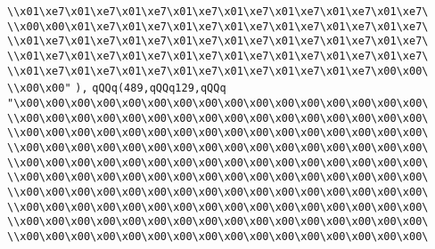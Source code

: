 \verb|\\x01\xe7\x01\xe7\x01\xe7\x01\xe7\x01\xe7\x01\xe7\x01\xe7\x01\xe7\|\newline
\verb|\\x00\x00\x01\xe7\x01\xe7\x01\xe7\x01\xe7\x01\xe7\x01\xe7\x01\xe7\|\newline
\verb|\\x01\xe7\x01\xe7\x01\xe7\x01\xe7\x01\xe7\x01\xe7\x01\xe7\x01\xe7\|\newline
\verb|\\x01\xe7\x01\xe7\x01\xe7\x01\xe7\x01\xe7\x01\xe7\x01\xe7\x01\xe7\|\newline
\verb|\\x01\xe7\x01\xe7\x01\xe7\x01\xe7\x01\xe7\x01\xe7\x01\xe7\x00\x00\|\newline
\verb|\\x00\x00"|\newline
\verb|),|\newline
\verb|qQQq(489,qQQq129,qQQq|\newline
\verb|"\x00\x00\x00\x00\x00\x00\x00\x00\x00\x00\x00\x00\x00\x00\x00\x00\|\newline
\verb|\\x00\x00\x00\x00\x00\x00\x00\x00\x00\x00\x00\x00\x00\x00\x00\x00\|\newline
\verb|\\x00\x00\x00\x00\x00\x00\x00\x00\x00\x00\x00\x00\x00\x00\x00\x00\|\newline
\verb|\\x00\x00\x00\x00\x00\x00\x00\x00\x00\x00\x00\x00\x00\x00\x00\x00\|\newline
\verb|\\x00\x00\x00\x00\x00\x00\x00\x00\x00\x00\x00\x00\x00\x00\x00\x00\|\newline
\verb|\\x00\x00\x00\x00\x00\x00\x00\x00\x00\x00\x00\x00\x00\x00\x00\x00\|\newline
\verb|\\x00\x00\x00\x00\x00\x00\x00\x00\x00\x00\x00\x00\x00\x00\x00\x00\|\newline
\verb|\\x00\x00\x00\x00\x00\x00\x00\x00\x00\x00\x00\x00\x00\x00\x00\x00\|\newline
\verb|\\x00\x00\x00\x00\x00\x00\x00\x00\x00\x00\x00\x00\x00\x00\x00\x00\|\newline
\verb|\\x00\x00\x00\x00\x00\x00\x00\x00\x00\x00\x00\x00\x00\x00\x00\x00\|\newline
